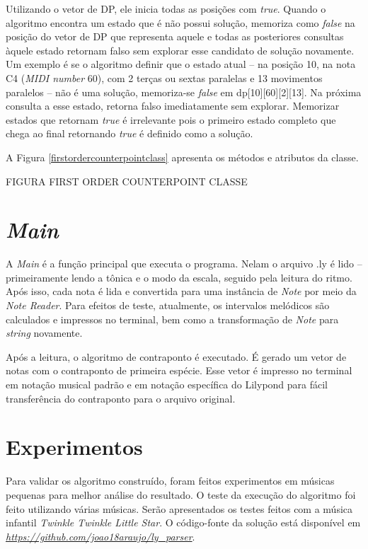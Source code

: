       Utilizando o vetor de DP, ele inicia todas as posições com \textit{true}. Quando o algoritmo encontra um estado que é não possui solução, memoriza como \textit{false} na posição do vetor de DP que representa aquele e todas as posteriores consultas àquele estado retornam falso sem explorar esse candidato de solução novamente. Um exemplo é se o algoritmo definir que o estado atual -- na posição 10, na nota C4 (\textit{MIDI number} 60), com 2 terças ou sextas paralelas e 13 movimentos paralelos -- não é uma solução, memoriza-se \textit{false} em dp[10][60][2][13]. Na próxima consulta a esse estado, retorna falso imediatamente sem explorar. Memorizar estados que retornam \textit{true} é irrelevante pois o primeiro estado completo que chega ao final retornando \textit{true} é definido como a solução.

      A Figura \ref{firstordercounterpointclass} apresenta os métodos e atributos da classe.

      FIGURA FIRST ORDER COUNTERPOINT CLASSE


  \section[\textit{Main}]{\textit{Main}}

    A \textit{Main} é a função principal que executa o programa. Nelam o arquivo .ly é lido -- primeiramente lendo a tônica e o modo da escala, seguido pela leitura do ritmo. Após isso, cada nota é lida e convertida para uma instância de \textit{Note} por meio da \textit{Note Reader}. Para efeitos de teste, atualmente, os intervalos melódicos são calculados e impressos no terminal, bem como a transformação de \textit{Note} para \textit{string} novamente.

    Após a leitura, o algoritmo de contraponto é executado. É gerado um vetor de notas com o contraponto de primeira espécie. Esse vetor é impresso no terminal em notação musical padrão e em notação específica do Lilypond para fácil transferência do contraponto para o arquivo original.

  \section[Experimentos]{Experimentos}

    Para validar os algoritmo construído, foram feitos experimentos em músicas pequenas para melhor análise do resultado. O teste da execução do algoritmo foi feito utilizando várias músicas. Serão apresentados os testes feitos com a música infantil \textit{Twinkle Twinkle Little Star}. O código-fonte da solução está disponível em \textit{\url{https://github.com/joao18araujo/ly_parser}}.

